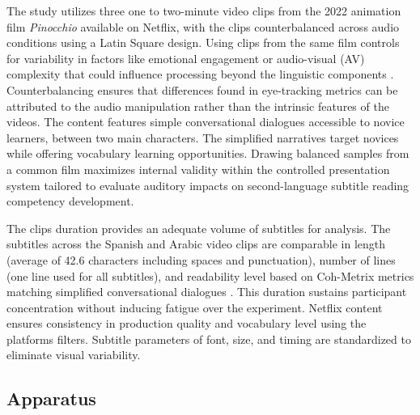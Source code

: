 The study utilizes three one to two-minute video clips from the 2022
animation film \emph{Pinocchio} available on Netflix, with the clips
counterbalanced across audio conditions using a Latin Square design.
Using clips from the same film controls for variability in factors like
emotional engagement or audio-visual (AV) complexity that could
influence processing beyond the linguistic components \cite{winke2013}. Counterbalancing ensures that differences found in eye-tracking
metrics can be attributed to the audio manipulation rather than the
intrinsic features of the videos. The content features simple
conversational dialogues accessible to novice learners, between two main
characters. The simplified narratives target novices while offering
vocabulary learning opportunities. Drawing balanced samples from a
common film maximizes internal validity within the controlled
presentation system tailored to evaluate auditory impacts on
second-language subtitle reading competency development.

The clip\textquotesingle s duration provides an adequate volume of
subtitles for analysis. The subtitles across the Spanish and Arabic
video clips are comparable in length (average of 42.6 characters
including spaces and punctuation), number of lines (one line used for
all subtitles), and readability level based on Coh-Metrix metrics
matching simplified conversational dialogues \cite{graesser2014}.
This duration sustains participant concentration without inducing
fatigue over the experiment. Netflix content ensures consistency in
production quality and vocabulary level using the
platform\textquotesingle s filters. Subtitle parameters of font, size,
and timing are standardized to eliminate visual variability.

\subsection{Apparatus}\label{sub-sec-apparatus}

